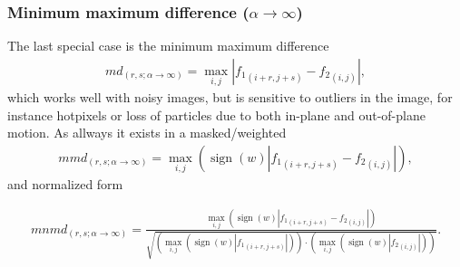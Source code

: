 \documentclass[10pt]{article}
\DeclareMathOperator*{\sign}{sign}
\begin{document}
\subsubsection{Minimum maximum difference ($\alpha\rightarrow\infty$)}
The last special case is the minimum maximum difference
\begin{align*}
	md_{(r,s;\alpha\rightarrow\infty)} = \max_{i,j} \left|{f_1}_{(i+r,j+s)}-{f_2}_{(i,j)}\right|,
\end{align*}
which  works well with noisy images, but is sensitive to outliers in the image, 
for instance hotpixels or loss of particles due to both in-plane and out-of-plane motion.    
As allways it exists in a masked/weighted 
\begin{align*}
	mmd_{(r,s;\alpha\rightarrow\infty)} = \max_{i,j} \left(\sign(w)\left|{f_1}_{(i+r,j+s)}-{f_2}_{(i,j)}\right|\right),
\end{align*}
and normalized form

 \begin{align*}
		mnmd_{(r,s;\alpha\rightarrow\infty)} = \frac{\max_{i,j} \left(\sign(w)\left|{f_1}_{(i+r,j+s)}-{f_2}_{(i,j)}\right|\right)}
		{\sqrt{\left(\max_{i,j}\left(\sign(w)\left|{f_1}_{(i+r,j+s)}\right|\right)\right)
		\cdot \left(\max_{i,j} \left(\sign(w)\left|{f_2}_{(i,j)}\right|\right)\right)}}.
   \end{align*}
   
  
   
\end{document}
